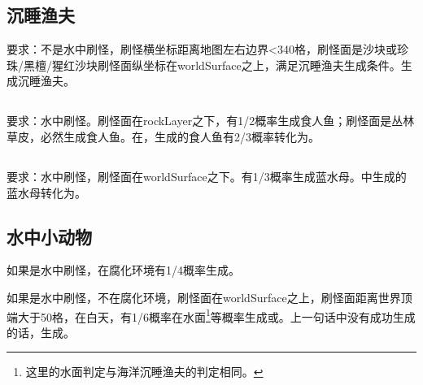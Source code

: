 \subsection{沉睡渔夫}
要求：不是水中刷怪，刷怪横坐标距离地图左右边界<340格，刷怪面是沙块或珍珠/黑檀/猩红沙块刷怪面纵坐标在worldSurface之上，满足沉睡渔夫生成条件。生成沉睡渔夫。

\subsection{}
要求：水中刷怪。刷怪面在rockLayer之下，有1/2概率生成食人鱼；刷怪面是丛林草皮，必然生成食人鱼。在，生成的食人鱼有2/3概率转化为。

\subsection{}
要求：水中刷怪，刷怪面在worldSurface之下。有1/3概率生成蓝水母。中生成的蓝水母转化为。
\begin{figure}[!ht]
    \centering
    \caption{}
\end{figure}

\subsection{水中小动物}
如果是水中刷怪，在腐化环境有1/4概率生成。

如果是水中刷怪，不在腐化环境，刷怪面在worldSurface之上，刷怪面距离世界顶端大于50格，在白天，有1/6概率在水面\footnote{这里的水面判定与海洋沉睡渔夫的判定相同。}等概率生成或。上一句话中没有成功生成的话，生成。

